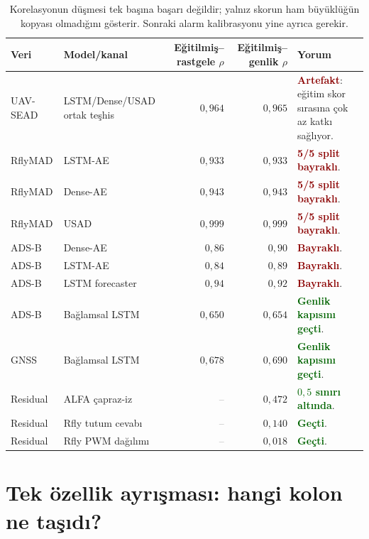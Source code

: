 \documentclass[10pt,a4paper]{article}
\newcommand{\good}[1]{\textcolor{darkgreen}{\textbf{#1}}}
\newcommand{\bad}[1]{\textcolor{darkred}{\textbf{#1}}}
\newcommand{\na}{\textcolor{gray}{--}}
\begin{document}
\begin{table}[ht]
\centering
\small
\begin{tabular}{llrrp{5.5cm}}
\toprule
\textbf{Veri} & \textbf{Model/kanal} & \textbf{Eğitilmiş--rastgele $\rho$} &
\textbf{Eğitilmiş--genlik $\rho$} & \textbf{Yorum} \\
\midrule
UAV-SEAD & LSTM/Dense/USAD ortak teşhis & $0{,}964$ & $0{,}965$ &
\bad{Artefakt}: eğitim skor sırasına çok az katkı sağlıyor. \\
RflyMAD & LSTM-AE & $0{,}933$ & $0{,}933$ & \bad{5/5 split bayraklı}. \\
RflyMAD & Dense-AE & $0{,}943$ & $0{,}943$ & \bad{5/5 split bayraklı}. \\
RflyMAD & USAD & $0{,}999$ & $0{,}999$ & \bad{5/5 split bayraklı}. \\
ADS-B & Dense-AE & $0{,}86$ & $0{,}90$ & \bad{Bayraklı}. \\
ADS-B & LSTM-AE & $0{,}84$ & $0{,}89$ & \bad{Bayraklı}. \\
ADS-B & LSTM forecaster & $0{,}94$ & $0{,}92$ & \bad{Bayraklı}. \\
ADS-B & Bağlamsal LSTM & $0{,}650$ & $0{,}654$ & \good{Genlik kapısını geçti}. \\
GNSS & Bağlamsal LSTM & $0{,}678$ & $0{,}690$ & \good{Genlik kapısını geçti}. \\
Residual & ALFA çapraz-iz & \na & $0{,}472$ & \good{$0{,}5$ sınırı altında}. \\
Residual & Rfly tutum cevabı & \na & $0{,}140$ & \good{Geçti}. \\
Residual & Rfly PWM dağılımı & \na & $0{,}018$ & \good{Geçti}. \\
\bottomrule
\end{tabular}
\caption{Korelasyonun düşmesi tek başına başarı değildir; yalnız skorun ham
büyüklüğün kopyası olmadığını gösterir. Sonraki alarm kalibrasyonu yine ayrıca gerekir.}
\end{table}

\section{Tek özellik ayrışması: hangi kolon ne taşıdı?}
\end{document}

